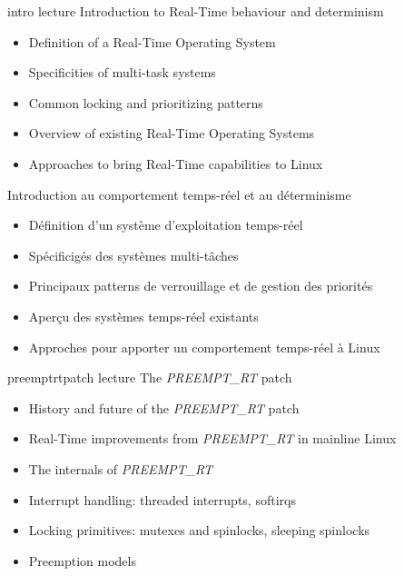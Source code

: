 
\def \trainers {maxime-chevallier}

\def \onsitelecturetimeratio{50}
\def \onsitelabtimeratio{50}


{intro}
{lecture}
{Introduction to Real-Time behaviour and determinism}
{
  \begin{itemize}
  \item Definition of a Real-Time Operating System
  \item Specificities of multi-task systems
  \item Common locking and prioritizing patterns
  \item Overview of existing Real-Time Operating Systems
  \item Approaches to bring Real-Time capabilities to Linux
  \end{itemize}
}
{Introduction au comportement temps-réel et au déterminisme}
{
  \begin{itemize}
  \item Définition d'un système d'exploitation temps-réel
  \item Spécificigés des systèmes multi-tâches
  \item Principaux patterns de verrouillage et de gestion des priorités
  \item Aperçu des systèmes temps-réel existants
  \item Approches pour apporter un comportement temps-réel à Linux
  \end{itemize}
}
{preemptrtpatch}
{lecture}
{The {\em PREEMPT\_RT} patch}
{
  \begin{itemize}
  \item History and future of the {\em PREEMPT\_RT} patch
  \item Real-Time improvements from {\em PREEMPT\_RT} in mainline Linux
  \item The internals of {\em PREEMPT\_RT}
  \item Interrupt handling: threaded interrupts, softirqs
  \item Locking primitives: mutexes and spinlocks, sleeping spinlocks
  \item Preemption models
  \end{itemize}
}
